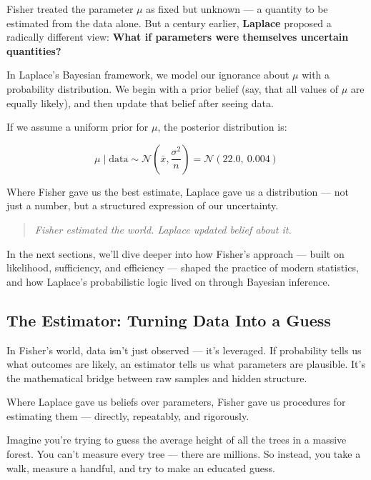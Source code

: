 Fisher treated the parameter \( \mu \) as fixed but unknown — a quantity to be estimated from the data alone. But a century earlier, \textbf{Laplace} proposed a radically different view:  
\textbf{What if parameters were themselves uncertain quantities?}

In Laplace’s Bayesian framework, we model our ignorance about \( \mu \) with a probability distribution. We begin with a prior belief (say, that all values of \( \mu \) are equally likely), and then update that belief after seeing data.

If we assume a uniform prior for \( \mu \), the posterior distribution is:

\[
\mu \mid \text{data} \sim \mathcal{N}\left(\bar{x}, \frac{\sigma^2}{n}\right) = \mathcal{N}(22.0,\ 0.004)
\]

Where Fisher gave us the best estimate, Laplace gave us a distribution — not just a number, but a structured expression of our uncertainty.

\begin{quote}
\textit{Fisher estimated the world. Laplace updated belief about it.}
\end{quote}

\medskip

In the next sections, we’ll dive deeper into how Fisher’s approach — built on likelihood, sufficiency, and efficiency — shaped the practice of modern statistics, and how Laplace’s probabilistic logic lived on through Bayesian inference.



\subsection{The Estimator: Turning Data Into a Guess}

In Fisher’s world, data isn’t just observed — it’s leveraged. If probability tells us what outcomes are likely, an estimator tells us what parameters are plausible. It’s the mathematical bridge between raw samples and hidden structure.

Where Laplace gave us beliefs over parameters, Fisher gave us procedures for estimating them — directly, repeatably, and rigorously.

\medskip

Imagine you're trying to guess the average height of all the trees in a massive forest. You can’t measure every tree — there are millions. So instead, you take a walk, measure a handful, and try to make an educated guess.

